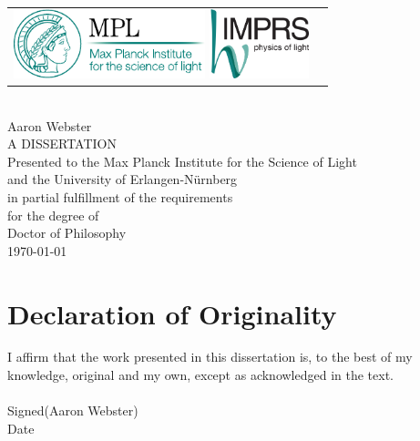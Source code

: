 


\begin{titlepage}
\begin{center}
\hfill\\[4cm]
{ \Huge {\bfseries {\distitle}} \par}
\vspace{3.0cm}
\begin{tabular}{lr}
\includegraphics[height=2cm,keepaspectratio]{images/Logo_MPL_englisch_kompakt_cmyk_110915}
\hspace{1.0cm}
%
\includegraphics[height=2cm,keepaspectratio]{images/Logo_IMPRS_4c_042012}
\end{tabular}
\vspace{3cm}
\\
{\huge Aaron Webster}\\
\vspace{1cm}
{\large A DISSERTATION}\\
\vspace{0.5cm}
Presented to the Max Planck Institute for the Science of Light\\
and the University of Erlangen-N\"urnberg\\
in partial fulfillment of the requirements\\
for the degree of\\
Doctor of Philosophy\\
\vspace{0.5cm}
\today
\end{center}
{}
\end{titlepage}

\chapter*{Declaration of Originality}
I affirm that the work presented in this dissertation is, to the best of my
knowledge, original and my own, except as acknowledged in the
text. \\
\hfill\\[1cm]
Signed\hspace{0.25cm}\makebox[5cm]{\hrulefill}\hspace{0.25cm}(Aaron Webster)
\hfill\\[1cm]
Date\hspace{0.51cm}\makebox[5cm]{\hrulefill}\hspace{0.25cm}
\vspace{2cm}

